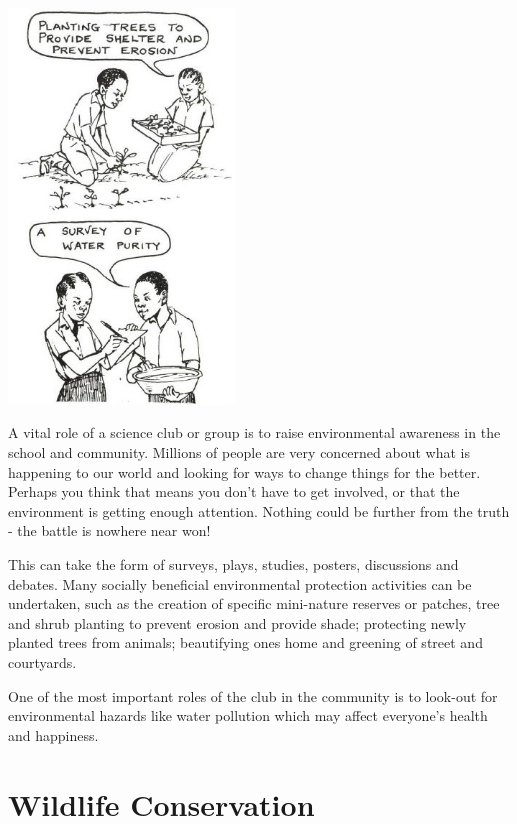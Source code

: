 \begin{multicols}{2}
\begin{center}
\includegraphics[width=0.45\textwidth]{./img/source/environmental-awareness.jpg}
\end{center}

A vital role of a science club or group is to raise
environmental awareness in the school and
community. Millions of people are very
concerned about what is happening to our world
and looking for ways to change things for the
better. Perhaps you think that means you don't
have to get involved, or that the environment is
getting enough attention. Nothing could be
further from the truth - the battle is nowhere near
won! 

This can take the form of surveys, plays,
studies, posters, discussions and debates. Many
socially beneficial environmental protection
activities can be undertaken, such as the creation
of specific mini-nature reserves or patches, tree
and shrub planting to prevent erosion and provide
shade; protecting newly planted trees from
animals; beautifying ones home and greening of
street and courtyards. 

One of the most important
roles of the club in the community is to look-out
for environmental hazards like water pollution
which may affect everyone's health and
happiness.


\section{Wildlife Conservation}


\end{multicols}

